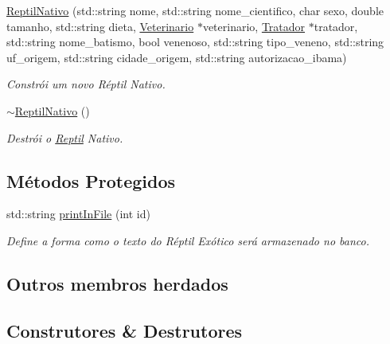 \begin{DoxyCompactItemize}
\hyperlink{classReptilNativo_a0476091e70eeff357cd2c6ea48f0aea0}{Reptil\+Nativo} (std\+::string nome, std\+::string nome\+\_\+cientifico, char sexo, double tamanho, std\+::string dieta, \hyperlink{classVeterinario}{Veterinario} $\ast$veterinario, \hyperlink{classTratador}{Tratador} $\ast$tratador, std\+::string nome\+\_\+batismo, bool venenoso, std\+::string tipo\+\_\+veneno, std\+::string uf\+\_\+origem, std\+::string cidade\+\_\+origem, std\+::string autorizacao\+\_\+ibama)
\begin{DoxyCompactList}\small\item\em Constrói um novo Réptil Nativo. \end{DoxyCompactList}\item 
\mbox{\label{classReptilNativo_a6de5838fd62a1c61175e690110cd7dc0}} 
\hyperlink{classReptilNativo_a6de5838fd62a1c61175e690110cd7dc0}{$\sim$\+Reptil\+Nativo} ()
\begin{DoxyCompactList}\small\item\em Destrói o \hyperlink{classReptil}{Reptil} Nativo. \end{DoxyCompactList}\end{DoxyCompactItemize}
\subsection*{Métodos Protegidos}
\begin{DoxyCompactItemize}
\item 
std\+::string \hyperlink{classReptilNativo_ac801a11c87a2847fb4b46488aa6bb789}{print\+In\+File} (int id)
\begin{DoxyCompactList}\small\item\em Define a forma como o texto do Réptil Exótico será armazenado no banco. \end{DoxyCompactList}\end{DoxyCompactItemize}
\subsection*{Outros membros herdados}


\subsection{Construtores \& Destrutores}
\mbox{\label{classReptilNativo_a1dcdc77205b5491129db3553bbf520fc}} 
